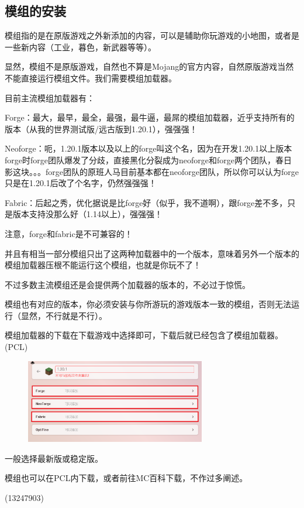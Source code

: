 \documentclass[UTF8,a4paper]{article}
\begin{document}
		\subsection{模组的安装}
			\hypertarget{modsinstall}{}
			\par 模组指的是在原版游戏之外新添加的内容，可以是辅助你玩游戏的小地图，或者是一些新内容（工业，暮色，新武器等等）。
			\par 显然，模组不是原版游戏，自然也不算是Mojang的官方内容，自然原版游戏当然不能直接运行模组文件。我们需要模组加载器。
			\par 目前主流模组加载器有：
			\par Forge：最大，最早，最全，最强，最牛逼，最屌的模组加载器，近乎支持所有的版本（从我的世界测试版/远古版到1.20.1），强强强！
			\par Neoforge：呃，1.20.1版本以及以上的forge叫这个名，因为在开发1.20.1以上版本forge时forge团队爆发了分歧，直接黑化分裂成为neoforge和forge两个团队，春日影这块。。。forge团队的原班人马目前基本都在neoforge团队，所以你可以认为forge只是在1.20.1后改了个名字，仍然强强强！
			\par Fabric：后起之秀，优化据说是比forge好（似乎，我不道啊），跟forge差不多，只是版本支持没那么好（1.14以上），强强强！
			\par 注意，forge和fabric是不可兼容的！
			\par 并且有相当一部分模组只出了这两种加载器中的一个版本，意味着另外一个版本的模组加载器压根不能运行这个模组，也就是你玩不了！
			\par 不过多数主流模组还是会提供两个加载器的版本的，不必过于惊慌。
			\par 模组也有对应的版本，你必须安装与你所游玩的游戏版本一致的模组，否则无法运行（显然，不行就是不行）。
			\par 模组加载器的下载在下载游戏中选择即可，下载后就已经包含了模组加载器。(PCL)
			\begin{figure}[H] %
				\centering %
				\includegraphics[width=0.7\textwidth]{./Pictures/PCL_2.jpg} %
			\end{figure}
			\par 一般选择最新版或稳定版。
			\par 模组也可以在PCL内下载，或者前往MC百科下载，不作过多阐述。
			\begin{flushright}(13247903)\end{flushright}
\end{document}
